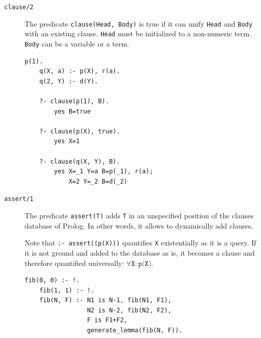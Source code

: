 \begin{description}
    \item[\texttt{clause/2}] 
        The predicate \texttt{clause(Head, Body)} is true if it can unify \texttt{Head} and \texttt{Body} with an existing clause.
        \texttt{Head} must be initialized to a non-numeric term. \texttt{Body} can be a variable or a term.

        \begin{example} \phantom{}
            \begin{lstlisting}[language={}]
    p(1).
    q(X, a) :- p(X), r(a).
    q(2, Y) :- d(Y).

    ?- clause(p(1), B).
        yes B=true

    ?- clause(p(X), true).
        yes X=1
    
    ?- clause(q(X, Y), B).
        yes X=_1 Y=a B=p(_1), r(a);
            X=2 Y=_2 B=d(_2)
            \end{lstlisting}  
        \end{example}

    \item[\texttt{assert/1}] 
        The predicate \texttt{assert(T)} adds \texttt{T} in an unspecified position of the clauses database of Prolog.
        In other words, it allows to dynamically add clauses.

        Note that \texttt{:- assert((p(X)))} quantifies \texttt{X} existentially as it is a query.
        If it is not ground and added to the database as is, 
        it becomes a clause and therefore quantified universally: $\forall \texttt{X}: \texttt{p(X)}$.

        \begin{example} \phantom{}
            \begin{lstlisting}[language={}]
    fib(0, 0) :- !.
    fib(1, 1) :- !.
    fib(N, F) :- N1 is N-1, fib(N1, F1),
                 N2 is N-2, fib(N2, F2),
                 F is F1+F2,
                 generate_lemma(fib(N, F)).


\end{lstlisting}
\end{example}
\end{description}
